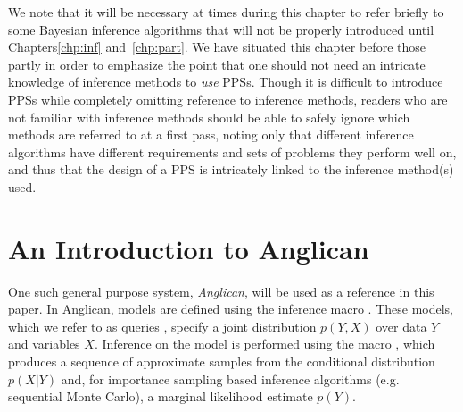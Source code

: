 
We note that it will be necessary at times during this chapter to refer briefly to some Bayesian inference
algorithms that will not be properly introduced until Chapters\ref{chp:inf} and~\ref{chp:part}.  
We have situated this chapter before those partly in order to emphasize the point that one should not 
need an intricate knowledge of inference methods to \emph{use} PPSs.  Though it is difficult
to introduce PPSs while completely omitting reference to inference methods, readers who
are not familiar with inference methods should be able to safely ignore which methods are referred to
at a first pass, noting only that different inference algorithms have different requirements and sets 
of problems they perform well on, and thus that the design of a PPS is intricately linked to the inference
method(s) used.





\section{An Introduction to Anglican}
\label{sec:probprog:anglican}

One such general purpose system, \emph{Anglican}, will be used as a reference in this paper.  In Anglican, models are defined using the inference macro . These models, which we refer to as queries \citep{goodman_uai_2008}, specify a joint distribution $p(Y,X)$ over data $Y$ and variables $X$. Inference on the model is performed using the macro \doquery, which produces a sequence of approximate samples from the conditional distribution $p(X|Y)$ and, for importance sampling based inference algorithms (e.g. sequential Monte Carlo), a marginal likelihood estimate $p(Y)$.  

